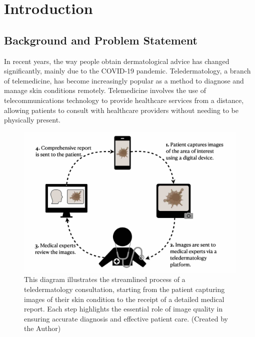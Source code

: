 \chapter{Introduction}
\label{ch:Introduction}

\section{Background and Problem Statement}
\label{sec:BackgroundProblemStatement}
In recent years, the way people obtain dermatological advice has changed significantly, mainly due to the COVID-19 pandemic. Teledermatology, a branch of telemedicine, has become increasingly popular as a method to diagnose and manage skin conditions remotely. Telemedicine involves the use of telecommunications technology to provide healthcare services from a distance, allowing patients to consult with healthcare providers without needing to be physically present. \par
\vspace{\baselineskip}
\begin{figure}[ht]
    \centering
    \includegraphics[keepaspectratio,width=14cm]{img/TD_workflow.jpg}
    \caption{This diagram illustrates the streamlined process of a teledermatology consultation, starting from the patient capturing images of their skin condition to the receipt of a detailed medical report. Each step highlights the essential role of image quality in ensuring accurate diagnosis and effective patient care. (Created by the Author)}
    \label{fig:TD_workflow}
\end{figure}

